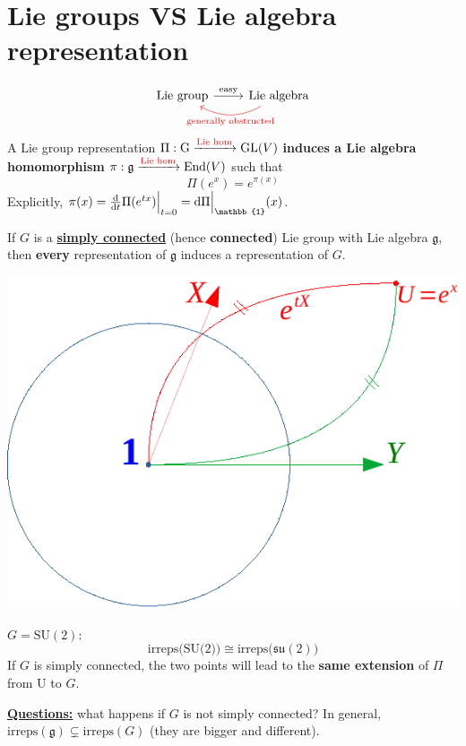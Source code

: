 \documentclass[../main.tex]{subfiles}
\begin{document}
\section{Lie groups VS Lie algebra representation}
\[
\begin{tikzcd}
\text{Lie group}\rar{\text{easy}} & \arrow[red, bend left]{l}[black,swap,below]{\color{red}\text{generally obstructed}} \text{Lie algebra}
\end{tikzcd}
\]
A Lie group representation $\Pi:\textrm{G}\xrightarrow[]{{\color{red}\text{Lie hom}}}\textrm{GL}(V)$ \textbf{induces a Lie algebra homomorphism} $\pi:\mathfrak{g}\xrightarrow[]{{\color{red}\text{Lie hom}}}\textrm{End}(V)$ such that \[
\Pi(e^x)=e^{\pi(x)}
\]
Explicitly, $\pi(x)=\dv{}{t}\Pi(e^{tx})\Bigr|_{\substack{t=0}}=\dd\Pi\Bigr|_{\mathbb{1}}(x)$.
\begin{theorem}
If $G$ is a \underline{\textbf{simply connected}} (hence \textbf{connected}) Lie group with Lie algebra $\mathfrak{g}$, then \textbf{every} representation of $\mathfrak{g}$ induces a representation of $G$.
\end{theorem}
\begin{marginfigure}
    \centering
    \includegraphics{images/Gsimplyconnected.pdf}
    \caption*{}
\end{marginfigure}
\begin{example}
$G=\textrm{SU}(2)$:
\[
\text{irreps(SU(2))}\cong\text{irreps($\mathfrak{su}(2)$)}
\]
If $G$ is simply connected, the two points will lead to the \textbf{same extension} of $\Pi$ from U to $G$.
\end{example}
\underline{\textbf{Questions:}} what happens if $G$ is not simply connected? In general, $\textrm{irreps}(\mathfrak{g})\subsetneq\textrm{irreps}(G)$ (they are bigger and different).
\end{document}
